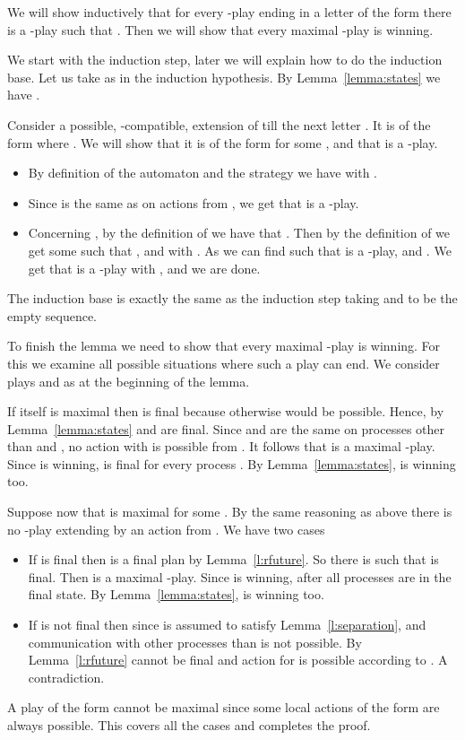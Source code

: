 \documentclass{llncs}
\renewenvironment{proof}{{\em Proof. }}{\nopagebreak
  \hspace*{\fill}}
\begin{document}
\begin{proof}
  We will show inductively that for every -play  ending 
  in a letter of the form  there is a -play
   such that . Then we will show that
  every maximal -play is winning.
  
  We start with the induction step, later we will explain how to
  do the induction base. Let us take  as in the induction
  hypothesis. By Lemma~\ref{lemma:states} we have
  .   

  Consider a possible, -compatible, extension of  till the next letter
  . It is of the form  where .  We will show that it is of the form
   for some ,
  and that  is a -play.
  \begin{itemize}
  \item By definition of the automaton  and the strategy 
    we have  with .
  \item Since  is the same as  on actions from , we get that  is a -play.

  \item Concerning , by the definition of  we have that
    . Then by the definition of  we get
    some  such that , and 
    with . As  we can find  such that  is a -play, 
    and . We get that  is a -play with
    , and we are done.
  \end{itemize}
The induction base is exactly the same as the induction step 
taking  and  to be the empty sequence. 

To finish the lemma we need to show that every maximal -play 
is winning. For this we examine all possible situations where
such a play can end. We consider plays  and  as at the
beginning of the lemma.

If  itself is maximal then  is final because
otherwise  would be possible. Hence, by
Lemma~\ref{lemma:states}  and  are
final. Since  and  are the same on processes other than 
and , no action  with  is possible
from . It follows that  is a maximal -play. Since  is
winning,  is final for every process . By
Lemma~\ref{lemma:states},  is winning too.

Suppose now that  is maximal for some
. By the same reasoning as above there is no
-play extending  by an action from . We have two cases
\begin{itemize}
\item If  is final then  is a final plan by
  Lemma~\ref{l:rfuture}. So there is  such that
   is final. Then  is a maximal -play. Since
   is winning, after  all processes are in the final state. By
  Lemma~\ref{lemma:states},  is winning too.
\item If  is not final then  since  is assumed to satisfy
  Lemma~\ref{l:separation}, and communication with other processes
  than  is not possible. By Lemma~\ref{l:rfuture}  cannot be
  final and action  for  is possible according to
  . A contradiction.
\end{itemize}

A play of the form  cannot be maximal since some local
actions of the form  are always possible. This covers all the
cases and completes the proof.
\end{proof}
\end{document}
